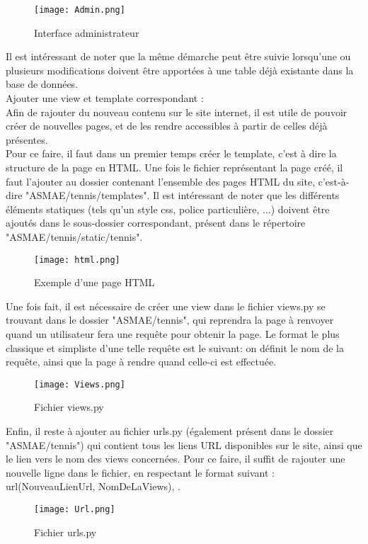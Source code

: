 \begin{figure}[H]
\centering
\texttt{[image: Admin.png]}
\caption{Interface administrateur}
\end{figure}

Il est intéressant de noter que la même démarche peut être suivie lorsqu'une ou plusieurs modifications doivent être apportées à une table déjà existante dans la base de données.\\

Ajouter une view et template correspondant :\\

Afin de rajouter du nouveau contenu sur le site internet, il est utile de pouvoir créer de nouvelles pages, et de les rendre accessibles à partir de celles déjà présentes.\\

Pour ce faire, il faut dans un premier temps créer le template, c'est à dire la structure de la page en HTML. Une fois le fichier représentant la page créé, il faut l'ajouter au dossier contenant l'ensemble des pages HTML du site, c'est-à-dire "ASMAE/tennis/templates". Il est intéressant de noter que les différents éléments statiques (tels qu'un style css, police particulière, ...) doivent être ajoutés dans le sous-dossier correspondant, présent dans le répertoire "ASMAE/tennis/static/tennis".\\

\begin{figure}[H]
\centering
\texttt{[image: html.png]}
\caption{Exemple d'une page HTML}
\end{figure}

Une fois fait, il est nécessaire de créer une view dans le fichier views.py se trouvant dans le dossier "ASMAE/tennis", qui reprendra la page à renvoyer quand un utilisateur fera une requête pour obtenir la page. Le format le plus classique et simpliste d'une telle requête est le suivant: on définit le nom de la requête, ainsi que la page à rendre quand celle-ci est effectuée.\\

\begin{figure}[H]
\centering
\texttt{[image: Views.png]}
\caption{Fichier views.py}
\end{figure}

Enfin, il reste à ajouter au fichier urls.py (également présent dans le dossier "ASMAE/tennis") qui contient tous les liens URL disponibles sur le site, ainsi que le lien vers le nom des views concernées. Pour ce faire, il suffit de rajouter une nouvelle ligne dans le fichier, en respectant le format suivant : url(NouveauLienUrl, NomDeLaViews), .

\begin{figure}[H]
\centering
\texttt{[image: Url.png]}
\caption{Fichier urls.py}
\end{figure}
